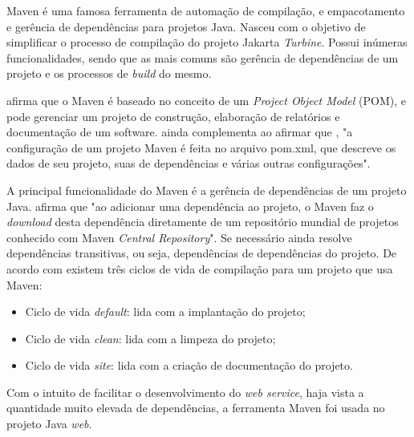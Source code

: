 	
	\par Maven é uma famosa ferramenta de automação de compilação, e empacotamento
e gerência de dependências para projetos Java. Nasceu com o objetivo de
simplificar o processo de compilação do projeto Jakarta \textit{Turbine}.
Possui inúmeras funcionalidades, sendo que as mais comuns são gerência de
dependências de um projeto e os processos de \textit{build} do mesmo.
	
	\par {} afirma que o Maven é baseado no conceito de
	um \textit{Project Object Model} (POM), e pode gerenciar um projeto de
construção, elaboração de relatórios e documentação de um software.
 ainda complementa ao afirmar que , "a configuração de
um projeto Maven é feita no arquivo pom.xml, que descreve os dados de seu
projeto, suas de dependências e várias outras configurações".
	
	\par A principal funcionalidade do Maven é a gerência de dependências de um
projeto Java.  afirma que "ao adicionar uma dependência
ao projeto, o Maven faz o \textit{download} desta dependência diretamente de
um repositório mundial de projetos  conhecido com Maven \textit{Central
Repository}". Se necessário ainda resolve dependências transitivas, ou seja,
dependências de dependências do projeto. De acordo com
 existem três ciclos de vida de compilação para um
projeto que usa Maven:

	\begin{itemize}
		  \item Ciclo de vida \textit{default}: lida com a implantação do projeto;
		  \item Ciclo de vida \textit{clean}: lida com a limpeza do projeto;
		  \item Ciclo de vida \textit{site}: lida com a criação de documentação
		  do projeto.
	\end{itemize}
	
	\par Com o intuito de facilitar o desenvolvimento do \textit{web service},
haja vista a quantidade muito elevada de dependências, a ferramenta Maven foi
usada no projeto Java \textit{web}.
